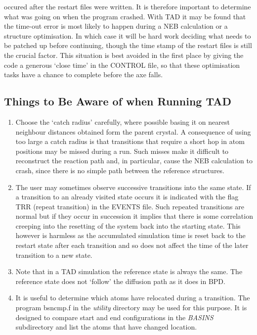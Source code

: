\begin{enumerate}
\begin{enumerate}
  occured after the restart files were written. It is therefore
  important to determine what was going on when the program
  crashed. With TAD it may be found that the time-out error is most
  likely to happen during a NEB calculation or a structure
  optimisation. In which case it will be hard work deciding what needs
  to be patched up before continuing, though the time stamp of the
  restart files is still the crucial factor. This situation is best
  avoided in the first place by giving the code a generous `close
  time' in the CONTROL file, so that these optimisation tasks have a
  chance to complete before the axe falls.
\end{enumerate}
\end{enumerate}

\subsection{Things to Be Aware of when Running  TAD}

\begin{enumerate}
\item Choose the `catch radius' carefully, where possible basing it on
  nearest neighbour distances obtained form the parent crystal. A
  consequence of using too large a catch radius is that transitions
  that require a short hop in atom positions may be missed during a
  run. Such misses make it difficult to reconstruct the reaction path
  and, in particular, cause the NEB calculation to crash, since there
  is no simple path between the reference structures.
\item The user may sometimes observe successive transitions into the same 
  state. If a transition to an already visited state occurs it is
  indicated with the flag TRR (repeat transition) in the EVENTS
  file. Such repeated transitions are normal but if they occur in
  succession it implies that there is some correlation creeping into
  the resetting of the system back into the starting state. This
  however is harmless as the accumulated simulation time is reset back
  to the restart state after each transition and so does not affect
  the time of the later transition to a new state.
\item Note that in a TAD simulation the reference state is always 
  the same. The reference state does not `follow' the diffusion path as
  it does in BPD.
\item It is useful to determine which atoms have relocated during a
  transition. The program bsncmp.f in the {\em  utility} directory 
  may be used for this purpose. It is designed to compare start and 
  end configurations in the {\em BASINS} subdirectory and list the 
  atoms that have changed location.
\end{enumerate}

